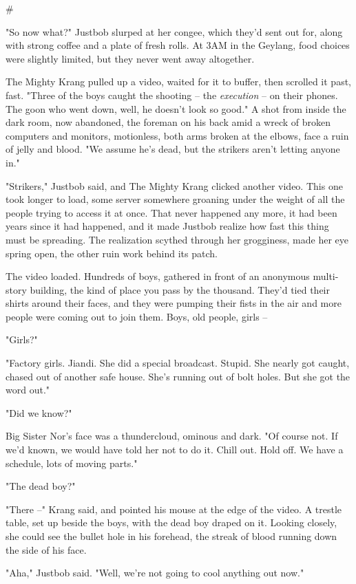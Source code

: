 \#

"So now what?" Justbob slurped at her congee, which they'd sent out
for, along with strong coffee and a plate of fresh rolls. At 3AM in
the Geylang, food choices were slightly limited, but they never
went away altogether.

The Mighty Krang pulled up a video, waited for it to buffer, then
scrolled it past, fast. "Three of the boys caught the shooting --
the \emph{execution} -- on their phones. The goon who went down,
well, he doesn't look so good." A shot from inside the dark room,
now abandoned, the foreman on his back amid a wreck of broken
computers and monitors, motionless, both arms broken at the elbows,
face a ruin of jelly and blood. "We assume he's dead, but the
strikers aren't letting anyone in."

"Strikers," Justbob said, and The Mighty Krang clicked another
video. This one took longer to load, some server somewhere groaning
under the weight of all the people trying to access it at once.
That never happened any more, it had been years since it had
happened, and it made Justbob realize how fast this thing must be
spreading. The realization scythed through her grogginess, made her
eye spring open, the other ruin work behind its patch.

The video loaded. Hundreds of boys, gathered in front of an
anonymous multi-story building, the kind of place you pass by the
thousand. They'd tied their shirts around their faces, and they
were pumping their fists in the air and more people were coming out
to join them. Boys, old people, girls --

"Girls?"

"Factory girls. Jiandi. She did a special broadcast. Stupid. She
nearly got caught, chased out of another safe house. She's running
out of bolt holes. But she got the word out."

"Did we know?"

Big Sister Nor's face was a thundercloud, ominous and dark. "Of
course not. If we'd known, we would have told her not to do it.
Chill out. Hold off. We have a schedule, lots of moving parts."

"The dead boy?"

"There --" Krang said, and pointed his mouse at the edge of the
video. A trestle table, set up beside the boys, with the dead boy
draped on it. Looking closely, she could see the bullet hole in his
forehead, the streak of blood running down the side of his face.

"Aha," Justbob said. "Well, we're not going to cool anything out
now."

